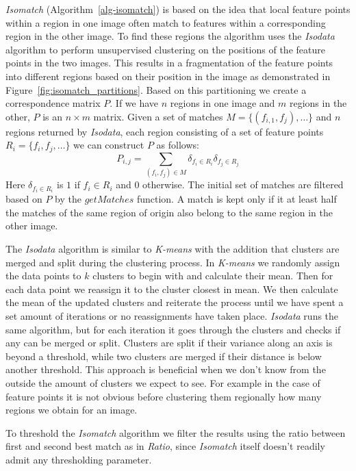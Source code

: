 \emph{Isomatch} (Algorithm~\ref{alg-isomatch}) \cite{das2008event} is 
based on the idea that local feature points within a region in one image 
often match to features within a corresponding region in the other 
image. To find these regions the algorithm uses the \emph{Isodata} 
algorithm \cite{ball1965isodata} to perform unsupervised clustering on 
the positions of the feature points in the two images.  This results in 
a fragmentation of the feature points into different regions based on 
their position in the image as demonstrated in 
Figure~\ref{fig:isomatch_partitions}. Based on this partitioning we 
create a correspondence matrix $P$. If we have $n$ regions in one image 
and $m$ regions in the other, $P$ is an $n \times m$ matrix.  Given a 
set of matches $M = \{(f_{i,1}, f_{j}), \ldots \}$ and $n$ regions 
returned by \emph{Isodata}, each region consisting of a set of feature 
points $R_i = \{f_i, f_j, \ldots\}$ we can construct $P$ as follows:
\begin{equation*}
    P_{i,j} = \sum_{(f_i,f_j) \in M} \delta_{f_i \in R_i}\delta_{f_j \in 
    R_j}
\end{equation*}
Here $\delta_{f_i \in R_i}$ is $1$ if $f_i \in R_i$ and $0$ otherwise.  
The initial set of matches are filtered based on $P$ by the $getMatches$ 
function. A match is kept only if it at least half the matches of the 
same region of origin also belong to the same region in the other image.  

The \emph{Isodata} algorithm is similar to \emph{K-means} with the 
addition that clusters are merged and split during the clustering 
process. In \emph{K-means} we randomly assign the data points to $k$ 
clusters to begin with and calculate their mean. Then for each data 
point we reassign it to the cluster closest in mean. We then calculate 
the mean of the updated clusters and reiterate the process until we have 
spent a set amount of iterations or no reassignments have taken place.  
\emph{Isodata} runs the same algorithm, but for each iteration it goes 
through the clusters and checks if any can be merged or split.  Clusters 
are split if their variance along an axis is beyond a threshold, while 
two clusters are merged if their distance is below another threshold.  
This approach is beneficial when we don't know from the outside the 
amount of clusters we expect to see. For example in the case of feature 
points it is not obvious before clustering them regionally how many 
regions we obtain for an image.

To threshold the \emph{Isomatch} algorithm we filter the results using 
the ratio between first and second best match as in \emph{Ratio}, since 
\emph{Isomatch} itself doesn't readily admit any thresholding parameter.  

